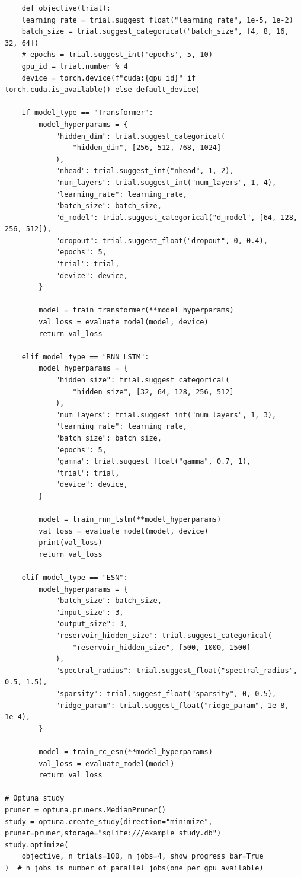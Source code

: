 \documentclass[11pt]{article}
\begin{document}
\begin{lstlisting}
    def objective(trial):
    learning_rate = trial.suggest_float("learning_rate", 1e-5, 1e-2)
    batch_size = trial.suggest_categorical("batch_size", [4, 8, 16, 32, 64])
    # epochs = trial.suggest_int('epochs', 5, 10)
    gpu_id = trial.number % 4  
    device = torch.device(f"cuda:{gpu_id}" if torch.cuda.is_available() else default_device)

    if model_type == "Transformer":
        model_hyperparams = {
            "hidden_dim": trial.suggest_categorical(
                "hidden_dim", [256, 512, 768, 1024]
            ),
            "nhead": trial.suggest_int("nhead", 1, 2),
            "num_layers": trial.suggest_int("num_layers", 1, 4),
            "learning_rate": learning_rate,
            "batch_size": batch_size,
            "d_model": trial.suggest_categorical("d_model", [64, 128, 256, 512]),
            "dropout": trial.suggest_float("dropout", 0, 0.4),
            "epochs": 5,
            "trial": trial,
            "device": device,
        }

        model = train_transformer(**model_hyperparams)
        val_loss = evaluate_model(model, device)
        return val_loss

    elif model_type == "RNN_LSTM":
        model_hyperparams = {
            "hidden_size": trial.suggest_categorical(
                "hidden_size", [32, 64, 128, 256, 512]
            ),
            "num_layers": trial.suggest_int("num_layers", 1, 3),
            "learning_rate": learning_rate,
            "batch_size": batch_size,
            "epochs": 5,
            "gamma": trial.suggest_float("gamma", 0.7, 1),
            "trial": trial,
            "device": device,
        }

        model = train_rnn_lstm(**model_hyperparams)
        val_loss = evaluate_model(model, device)
        print(val_loss)
        return val_loss

    elif model_type == "ESN":
        model_hyperparams = {
            "batch_size": batch_size,
            "input_size": 3,
            "output_size": 3,
            "reservoir_hidden_size": trial.suggest_categorical(
                "reservoir_hidden_size", [500, 1000, 1500]
            ),
            "spectral_radius": trial.suggest_float("spectral_radius", 0.5, 1.5),
            "sparsity": trial.suggest_float("sparsity", 0, 0.5),
            "ridge_param": trial.suggest_float("ridge_param", 1e-8, 1e-4),
        }

        model = train_rc_esn(**model_hyperparams)
        val_loss = evaluate_model(model)
        return val_loss

# Optuna study
pruner = optuna.pruners.MedianPruner()
study = optuna.create_study(direction="minimize", pruner=pruner,storage="sqlite:///example_study.db")
study.optimize(
    objective, n_trials=100, n_jobs=4, show_progress_bar=True
)  # n_jobs is number of parallel jobs(one per gpu available)
\end{lstlisting}
\end{document}

